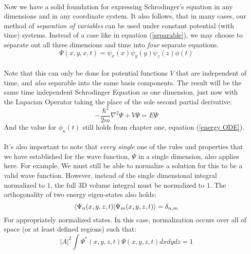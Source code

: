 \documentclass[12pt,letterpaper]{book}
\begin{document}
\paragraph*{}Now we have a solid foundation for expressing Schrodinger's equation in any dimensions and in any coordinate system. It also follows, that in many cases, our method of \textit{separation of variables} can be used under constant potential (with time) systems. Instead of a case like in equation (\ref{separable}), we may choose to separate out all three dimensions and time into \textit{four} separate equations.
\begin{equation}
\Psi(x,y,x,t) = \psi_x(x) \psi_y(y) \psi_z(z) \phi(t)
\end{equation}

\paragraph*{}Note that this can only be done for potential functions $V$ that are independent of time, and \textit{also} separable into the same basis components. The result will be the same time independent Schrodinger Equation as one dimension, just now with the Lapacian Operator taking the place of the sole second partial derivative:
\begin{equation}
\label{3D TSIE}
-\frac{\hbar^2}{2m}\nabla^2\Psi + V\Psi = E\Psi
\end{equation}
And the value for $\phi_n(t)$ still holds from chapter one, equation (\ref{energy ODE}).

\paragraph*{}It's also important to note that \textit{every single} one of the rules and properties that we have established for the wave function, $\Psi$ in a single dimension, also applies here. For example, We must still be able to normalize a solution for this to be a valid wave function. However, instead of the single dimensional integral normalized to $1$, the full 3D volume integral must be normalized to $1$. The orthogonality of two energy eigen-states also holds:
\begin{equation}
\braket{\Psi_n(x,y,z,t)}{\Psi_m(x,y,z,t)} = \delta_{n,m}
\end{equation}
For appropriately normalized states. In this case, normalization occurs over all of space (or at least defined regions) such that:
\begin{equation}
|A|^2\int \Psi^*(x,y,z,t)\Psi(x,y,z,t)dxdydz = 1
\end{equation}
\end{document}
